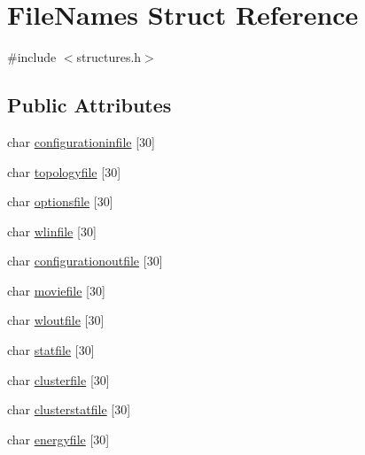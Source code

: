 \hypertarget{struct_file_names}{\section{File\+Names Struct Reference}
\label{struct_file_names}
}


{\ttfamily \#include $<$structures.\+h$>$}

\subsection*{Public Attributes}
\begin{DoxyCompactItemize}
\item 
char \hyperlink{struct_file_names_a2ba488883859beebf0e45d4fe64dce1e}{configurationinfile} \mbox{[}30\mbox{]}
\item 
char \hyperlink{struct_file_names_a5d57cf5a04876391b131a9c9307bc7d5}{topologyfile} \mbox{[}30\mbox{]}
\item 
char \hyperlink{struct_file_names_aef0ce496bdcc9b924a111438a1e16573}{optionsfile} \mbox{[}30\mbox{]}
\item 
char \hyperlink{struct_file_names_af41fd595b79047dfee97d3a66aa7ef40}{wlinfile} \mbox{[}30\mbox{]}
\item 
char \hyperlink{struct_file_names_a6d96709d8d21f5194c072ef80db0e8a7}{configurationoutfile} \mbox{[}30\mbox{]}
\item 
char \hyperlink{struct_file_names_ab6920a417c86a04aa771c248f75c6bf9}{moviefile} \mbox{[}30\mbox{]}
\item 
char \hyperlink{struct_file_names_ad3186b4b1d3a03d1cce61385475df1a9}{wloutfile} \mbox{[}30\mbox{]}
\item 
char \hyperlink{struct_file_names_a571bce947227b34ce9056cbff89c02b3}{statfile} \mbox{[}30\mbox{]}
\item 
char \hyperlink{struct_file_names_a308f1e0e953456ba44b873a1a336d707}{clusterfile} \mbox{[}30\mbox{]}
\item 
char \hyperlink{struct_file_names_a531ef786f58d7d412c6f841dd252e906}{clusterstatfile} \mbox{[}30\mbox{]}
\item 
char \hyperlink{struct_file_names_aab15a15f40bcf78ab8e6a00da44bc672}{energyfile} \mbox{[}30\mbox{]}
\end{DoxyCompactItemize}



